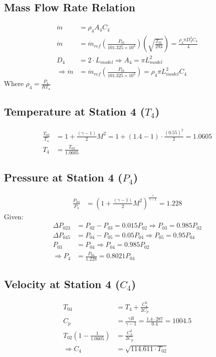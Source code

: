 \documentclass[12pt,a4paper]{article}
\begin{document}
\subsection*{Mass Flow Rate Relation}
\begin{align*}
\dot{m} &= \rho_4 A_4 C_4 \\
\dot{m} &= \dot{m}_{ref} \left( \frac{P_{01}}{101.325 \times 10^3} \right) \left(\sqrt{\frac{T_{01}}{293}}\right) = \frac{\rho_4 \pi D_4^2 C_4}{4} \\
D_4 &= 2 \cdot L_{model} \Rightarrow A_4 = \pi L_{model}^2 \\
\Rightarrow \dot{m} &= \dot{m}_{ref} \left( \frac{P_{01}}{101.325 \times 10^3} \right) = \rho_4 \pi L_{model}^2 C_4 \tag{1}
\end{align*}
\noindent Where $\rho_4 = \frac{P_4}{RT_4}$

\subsection*{Temperature at Station 4 ($T_4$)}
\begin{align*}
\frac{T_{02}}{T_4} &= 1 + \frac{(\gamma - 1)}{2} M^2 = 1 + (1.4 - 1) \cdot \frac{(0.55)^2}{2} = 1.0605 \\
T_4 &= \frac{T_{02}}{1.0605} \tag{2}
\end{align*}

\subsection*{Pressure at Station 4 ($P_4$)}
\begin{align*}
\frac{P_{04}}{P_4} &= \left(1 + \frac{(\gamma - 1)}{2} M^2 \right)^{\frac{\gamma}{\gamma - 1}} = 1.228 \tag{3}
\end{align*}
\noindent Given:
\begin{align*}
\Delta P_{023} &= P_{02} - P_{03} = 0.015 P_{02} \Rightarrow P_{03} = 0.985 P_{02} \\
\Delta P_{045} &= P_{04} - P_{05} = 0.05 P_{04} \Rightarrow P_{05} = 0.95 P_{04} \\
P_{03} &= P_{04} \Rightarrow P_{04} = 0.985 P_{02} \tag{4} \\
\Rightarrow P_4 &= \frac{P_{04}}{1.228} = 0.8021 P_{04}
\end{align*}

\subsection*{Velocity at Station 4 ($C_4$)}
\begin{align*}
T_{04} &= T_4 + \frac{C_4^2}{2 C_p} \\
C_p &= \frac{\gamma R}{\gamma - 1} = \frac{1.4 \cdot 287}{0.4} = 1004.5 \\
T_{02} \left(1 - \frac{1}{1.0605} \right) &= \frac{C_4^2}{2 C_p} \\
\Rightarrow C_4 &= \sqrt{114.611 \cdot T_{02}} \tag{5}
\end{align*}
\end{document}
